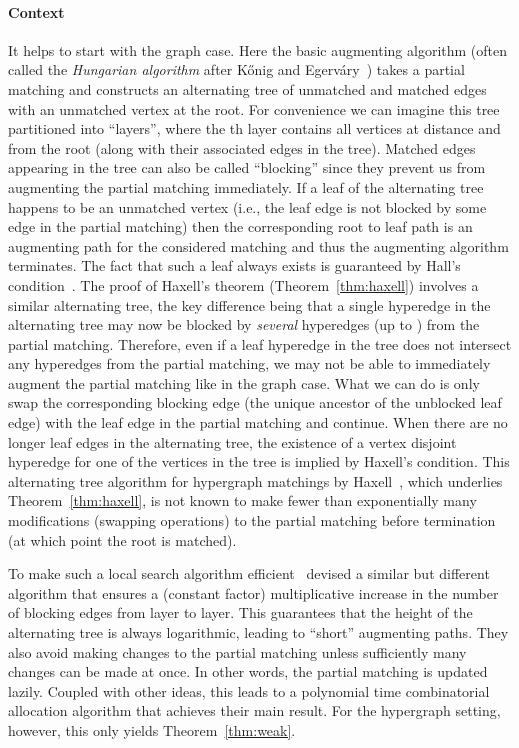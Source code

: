 \documentclass[11pt]{article}
\theoremstyle{definition}
\theoremstyle{remark}
\begin{document}
\paragraph{Context} It helps to start with the graph case. Here the
basic augmenting algorithm (often called the \emph{Hungarian
  algorithm} after K\H onig and
Egerv\'ary~\cite{west2001introduction}) takes a partial matching and
constructs an alternating tree of unmatched and matched edges with an
unmatched vertex at the root. For convenience we can imagine this tree
partitioned into ``layers'', where the th layer contains all vertices
at distance  and  from the root (along with their associated
edges in the tree). Matched edges appearing in the tree can also be
called ``blocking'' since they prevent us from augmenting the partial
matching immediately. If a leaf of the alternating tree happens to be
an unmatched vertex (i.e., the leaf edge is not blocked by some edge
in the partial matching) then the corresponding root to leaf path is
an augmenting path for the considered matching and thus the augmenting
algorithm terminates. The fact that such a leaf always exists is
guaranteed by Hall's condition~\cite{hall1935representatives}. The
proof of Haxell's theorem (Theorem~\ref{thm:haxell}) involves a
similar alternating tree, the key difference being that a single
hyperedge in the alternating tree may now be blocked by \emph{several}
hyperedges (up to ) from the partial matching. Therefore, even if
a leaf hyperedge in the tree does not intersect any hyperedges from
the partial matching, we may not be able to immediately augment the
partial matching like in the graph case. What we can do is only swap
the corresponding blocking edge (the unique ancestor of the unblocked
leaf edge) with the leaf edge in the partial matching and
continue. When there are no longer leaf edges in the alternating tree,
the existence of a vertex disjoint hyperedge for one of the 
vertices in the tree is implied by Haxell's condition. This
alternating tree algorithm for hypergraph matchings by
Haxell~\cite{haxell1995condition}, which underlies
Theorem~\ref{thm:haxell}, is not known to make fewer than
exponentially many modifications (swapping operations) to the partial
matching before termination (at which point the root is matched).

To make such a local search algorithm
efficient~\cite{DBLP:conf/soda/AnnamalaiKS15} devised a similar but
different algorithm that ensures a (constant factor) multiplicative
increase in the number of blocking edges from layer to layer. This
guarantees that the height of the alternating tree is always
logarithmic, leading to ``short'' augmenting paths. They also avoid
making changes to the partial matching unless sufficiently many
changes can be made at once. In other words, the partial matching is
updated lazily. Coupled with other ideas, this leads to a polynomial
time combinatorial allocation algorithm that achieves their main
result. For the hypergraph setting, however, this only yields
Theorem~\ref{thm:weak}.
\end{document}
